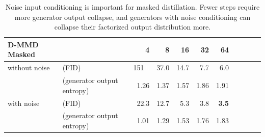 \begin{table}[t]
    \centering
    \begin{tabular}{ll|rrrrrrrrr}
        \toprule
         \bfseries D-MMD Masked & & 4 & 8 & 16 & 32 & 64 \\ \midrule
        without noise & (FID) & 151\textcolor{white}{.0} & 37.0 & 14.7 & 7.7 & 6.0 \\
        \hspace{.5cm} & (generator output entropy) & 1.26 & 1.37 & 1.57 & 1.86 & 1.91 \\ \midrule
        with noise & (FID) & 22.3 & 12.7 & 5.3 & 3.8 & \textbf{3.5} \\
        \hspace{.5cm} &(generator output entropy) & 1.01 & 1.29 & 1.53 & 1.76 & 1.83 \\
        \bottomrule
    \end{tabular}
    \caption{Noise input conditioning is important for masked distillation. Fewer steps require more generator output collapse, and generators with noise conditioning can collapse their factorized output distribution more.
    }
    \label{tab:cifar10_noiseinput}
\end{table}
